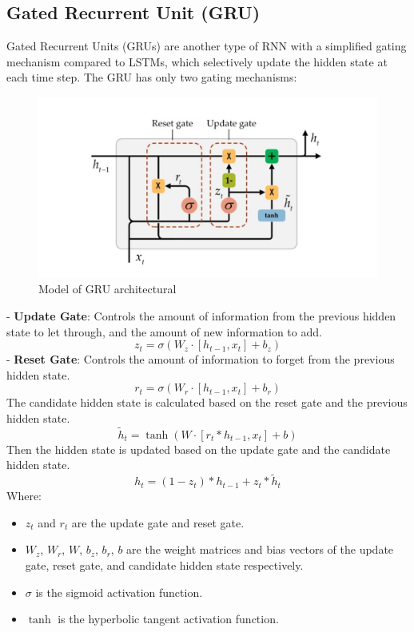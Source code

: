 \documentclass{ieeeojies}
\begin{document}
\subsection{Gated Recurrent Unit (GRU)}
Gated Recurrent Units (GRUs) are another type of RNN with a simplified gating mechanism compared to LSTMs, which selectively update the hidden state at each time step. The GRU has only two gating mechanisms:\\
\begin{figure}[H]
    \centering
    \includegraphics[width=\linewidth]{./image/GRU.png}
    \caption{Model of GRU architectural}
    \label{fig:9}
\end{figure}
\noindent
- \textbf{Update Gate}: Controls the amount of information from the previous hidden state to let through, and the amount of new information to add.
\begin{dmath*}
    z_t = \sigma(W_z \cdot [h_{t-1}, x_t] + b_z)
\end{dmath*}
- \textbf{Reset Gate}: Controls the amount of information to forget from the previous hidden state.
\begin{dmath*}
    r_t = \sigma(W_r \cdot [h_{t-1}, x_t] + b_r)
\end{dmath*}
The candidate hidden state is calculated based on the reset gate and the previous hidden state.
\begin{dmath*}
    \tilde{h}_t = \tanh(W \cdot [r_t * h_{t-1}, x_t] + b)
\end{dmath*}
Then the hidden state is updated based on the update gate and the candidate hidden state.
\begin{dmath*}
    h_t = (1 - z_t) * h_{t-1} + z_t * \tilde{h}_t
\end{dmath*}
Where:
\begin{itemize}
    \item \(z_t\) and \(r_t\) are the update gate and reset gate.
    \item \(W_z\), \(W_r\), \(W\), \(b_z\), \(b_r\), \(b\) are the weight matrices and bias vectors of the update gate, reset gate, and candidate hidden state respectively.
    \item \(\sigma\) is the sigmoid activation function.
    \item \(\tanh\) is the hyperbolic tangent activation function.
\end{itemize}
\end{document}
